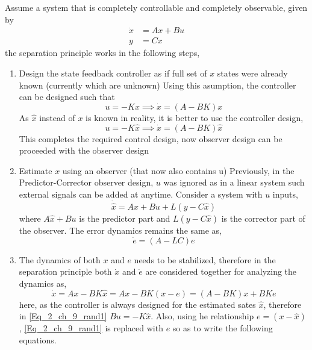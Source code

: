 Assume a system that is completely controllable and completely observable, given by
\begin{align*}
	\dot{x} &= Ax + Bu \\
	y &= Cx
\end{align*}
the separation principle works in the following steps,
\begin{enumerate}
	\item Design the state feedback controller as if full set of $x$ states were already known (currently which are unknown)
	Using this asumption, the controller can be designed such that
	\begin{equation*}
		u = -K x \implies \dot{x} = (A - BK)x
	\end{equation*}
	As $\hat{x}$ instead of $x$ is known in reality, it is better to use the controller design,
	\begin{equation*}
		u = -K \hat{x} \implies \dot{x} = (A - BK)\hat{x}
	\end{equation*}
	This completes the required control design, now observer design can be proceeded with the observer design
	\item Estimate $x$ using an observer (that now also contains u)
	Previously, in the Predictor-Corrector observer design, $u$ was ignored as in a linear system such external signals can be added at anytime. Consider a system with $u$ inputs,
	\begin{equation*}
		\dot{\hat{x}} = A \hat{x} + B u + L (y - C\hat{x})
	\end{equation*}
	where $A \hat{x} + B u$ is the predictor part and $L (y - C\hat{x})$ is the corrector part of the observer. The error dynamics remains the same as,
	\begin{equation*}
		\dot{e} = (A - LC) e
	\end{equation*}
	\item The dynamics of both $x$ and $e$ needs to be stabilized, therefore in the separation principle both $\dot{x}$ and $\dot{e}$ are considered together for analyzing the dynamics as,
	\begin{equation}\label{Eq_2_ch_9_rand1}
		\dot{x} = Ax - BK \hat{x} = Ax - BK (x - e) = (A - BK)x + BKe
	\end{equation}
	here, as the controller is always designed for the estimated sates $\hat{x}$, therefore in \eqref{Eq_2_ch_9_rand1} $Bu = - K \hat{x}$. Also, using he relationship $e = (x - \hat{x})$, \eqref{Eq_2_ch_9_rand1} is replaced with $e$ so as to write the following equations.
	\begin{equation}\label{Eq_2_ch_9_rand2}

\end{equation}
\end{enumerate}
